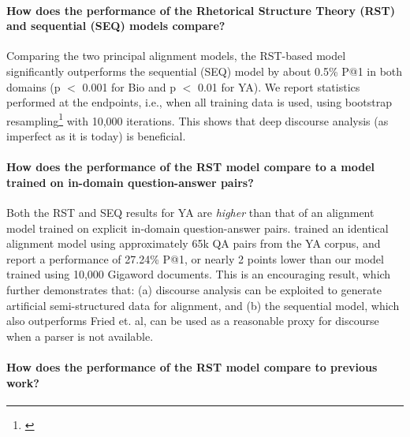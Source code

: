 \paragraph{How does the performance of the Rhetorical Structure Theory (RST) and sequential (SEQ) models compare?}

Comparing the two principal alignment models, the RST-based model significantly outperforms the sequential (SEQ) model by about 0.5\% P@1 in both domains (p $<$ 0.001 for Bio and p $<$ 0.01 for YA).  We report statistics performed at the endpoints, i.e., when all training data is used, using bootstrap resampling\footnote{\label{footnote:bootstrap} } with 10,000 iterations. This shows that deep discourse analysis (as imperfect as it is today) is beneficial. 

\paragraph{How does the performance of the RST model compare to a model trained on in-domain question-answer pairs?}

Both the RST and SEQ results for YA are {\em higher} than that of an alignment model trained on explicit in-domain question-answer pairs. \citet{fried2015higher} trained an identical alignment model using approximately 65k QA pairs from the YA corpus, and report a performance of 27.24\% P@1, or nearly 2 points lower than our model trained using 10,000 Gigaword documents. This is an encouraging result, which further demonstrates that: (a) discourse analysis can be exploited to generate artificial semi-structured data for alignment, and (b) the sequential model, which also outperforms Fried et. al, can be used as a reasonable proxy for discourse when a parser is not available. 

\paragraph{How does the performance of the RST model compare to previous work?}

